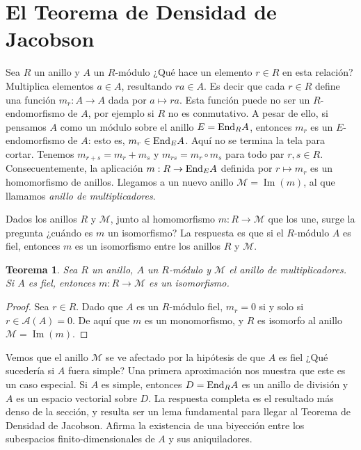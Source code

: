 \documentclass{report}
\newcommand{\End}{\textnormal{End}}
\DeclareMathOperator{\image}{\text{Im}}
\newtheorem{theorem}{Teorema}
\begin{document}
  \section{El Teorema de Densidad de Jacobson}

  Sea \(R\) un anillo y \(A\) un \(R\)-módulo 
  ¿Qué hace un elemento \(r \in R\) en esta relación?
  Multiplica elementos \(a \in A\), resultando \(r a \in A\).
  Es decir que cada \(r \in R\) define una función \(m_r : A \rightarrow A\) dada por \(a \mapsto r a\).
  Esta función puede no ser un \(R\)-endomorfismo de \(A\), por ejemplo si \(R\) no es conmutativo.
  A pesar de ello, si pensamos \(A\) como un módulo sobre el anillo \(E = \End_R A\), entonces \(m_r\) es un \(E\)-endomorfismo de \(A\): esto es, \(m_r \in \End_E A\).
  Aquí no se termina la tela para cortar.
  Tenemos \(m_{r + s} = m_r + m_s\) y \(m_{r s} = m_r \circ m_s\) para todo par \(r, s \in R\).
  Consecuentemente, la aplicación \(m : R \rightarrow \End_E A\) definida por \(r \mapsto m_r\) es un homomorfismo de anillos.
  Llegamos a un nuevo anillo \(\mathcal{M} = \image(m)\), al que llamamos \emph{anillo de multiplicadores}.

  Dados los anillos \(R\) y \(\mathcal{M}\), junto al homomorfismo \(m : R \rightarrow \mathcal{M}\) que los une, surge la pregunta
  ¿cuándo es \(m\) un isomorfismo?
  La respuesta es que si el \(R\)-módulo \(A\) es fiel, entonces \(m\) es un isomorfismo entre los anillos \(R\) y \(\mathcal{M}\).

  \begin{theorem}
    \label{theorem:multiplierIsomorphism}
    Sea \(R\) un anillo, \(A\) un \(R\)-módulo y \(\mathcal{M}\) el anillo de multiplicadores.
    Si \(A\) es fiel, entonces \(m : R \rightarrow \mathcal{M}\) es un isomorfismo.
  \end{theorem}
  \begin{proof}
    Sea \(r \in R\).
    Dado que \(A\) es un \(R\)-módulo fiel, \(m_r = 0\) si y solo si \(r \in \mathcal{A}(A) = 0\).
    De aquí que \(m\) es un monomorfismo, y \(R\) es isomorfo al anillo \(\mathcal{M} = \image(m)\).
  \end{proof}

  Vemos que el anillo \(\mathcal{M}\) se ve afectado por la hipótesis de que \(A\) es fiel
  ¿Qué sucedería si \(A\) fuera simple?
  Una primera aproximación nos muestra que este es un caso especial.
  Si \(A\) es simple, entonces \(D = \End_R A\) es un anillo de división y \(A\) es un espacio vectorial sobre \(D\).
  La respuesta completa es el resultado más denso de la sección, y resulta ser un lema fundamental para llegar al Teorema de Densidad de Jacobson.
  Afirma la existencia de una biyección entre los subespacios finito-dimensionales de \(A\) y sus aniquiladores.
\end{document}
